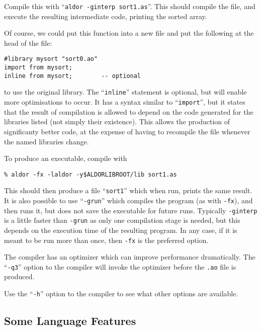 \documentclass{article}
\begin{document}
Compile this with ``{\tt aldor -ginterp sort1.as}''.  This should
compile the file, and execute the resulting intermediate code,
printing the sorted array.

Of course, we could put this function into a new file and put the
following at the head of the file:
\begin{small}
\begin{verbatim}
#library mysort "sort0.ao"
import from mysort;
inline from mysort;        -- optional
\end{verbatim}
\end{small}
to use the original library.  The ``{\tt inline}'' statement is
optional, but will enable more optimisations to occur.  It has a
syntax similar to ``{\tt import}'', but it states that the result of
compilation is allowed to depend on the code generated for the
libraries listed (not simply their existence).  This allows the
production of significanty better code, at the expense of having to
recompile the file whenever the named libraries change.

To produce an executable, compile with
\begin{small}
\begin{verbatim}
% aldor -fx -laldor -y$ALDORLIBROOT/lib sort1.as
\end{verbatim}
\end{small}
This should then produce a file ``{\tt sort1}'' which when run, prints
the same result.  It is also possible to use ``{\tt -grun}'' which
compiles the program (as with {\tt -fx}), and then runs it, but does not
save the executable for future runs. Typically {\tt -ginterp} is a little
faster than {\tt -grun} as only one compilation stage is needed, but this
depends on the execution time of the resulting program. In any case, if
it is meant to be run more than once, then {\tt -fx} is the preferred option.

The compiler has an optimizer which can improve performance
dramatically.  The ``{\tt -q3}'' option to the compiler will invoke the
optimizer before the {\tt .ao} file is produced.

Use the ``{\tt -h}'' option to the compiler to see what
other options are available.

\subsection{Some Language Features}
%
\end{document}
